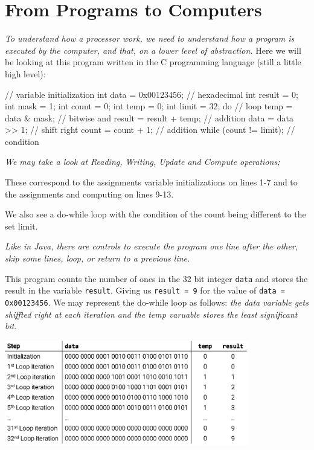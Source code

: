 \documentclass[12pt,openany]{book}
\begin{document}
\section{From Programs to Computers}
\textit{To understand how a processor work, we need to understand how a program is executed by the computer, and that, on a lower level of abstraction.}
\newline
Here we will be looking at this program written in the C programming language (still a little high level): \newline
\newline
\begin{minipage}[htp]{0.5\textwidth}
\begin{cc}
// variable initialization
int data = 0x00123456; // hexadecimal
int result = 0;
int mask = 1;
int count = 0;
int temp = 0;
int limit = 32;
do { // loop
temp = data & mask; // bitwise and
result = result + temp; // addition
data = data >> 1; // shift right
count = count + 1; // addition
} while (count != limit); // condition
\end{cc}
\end{minipage}
\hfill
\vline
\hfill
\begin{minipage}[htp]{0.4\textwidth}
	\footnotesize
\begin{justify}
\textit{We may take a look at Reading, Writing, Update and Compute operations;}\newline 
\end{justify}
\begin{justify}
	These correspond to the assignments variable initializations on lines 1-7 and to the assignments and computing on lines 9-13.
\end{justify}
\begin{justify}
We also see a do-while loop with the condition of the count being different to the set limit.
\end{justify} 
\begin{justify}
	\textit{Like in Java, there are controls to execute the program one line after the other, skip some lines, loop, or return to a previous line.}
\end{justify}
\end{minipage}
This program counts the number of ones in the 32 bit integer \texttt{data} and stores the result in the variable \texttt{result}. Giving us \texttt{result = 9} for the value of \texttt{data = 0x00123456}.
\newline
We may represent the do-while loop as follows:
\textit{the data variable gets shiffted right at each iteration and the temp varuable stores the least significant bit.}
\begin{center}
\includegraphics[width=0.8\textwidth]{circuits/19.2.png}
\end{center}
\end{document}
